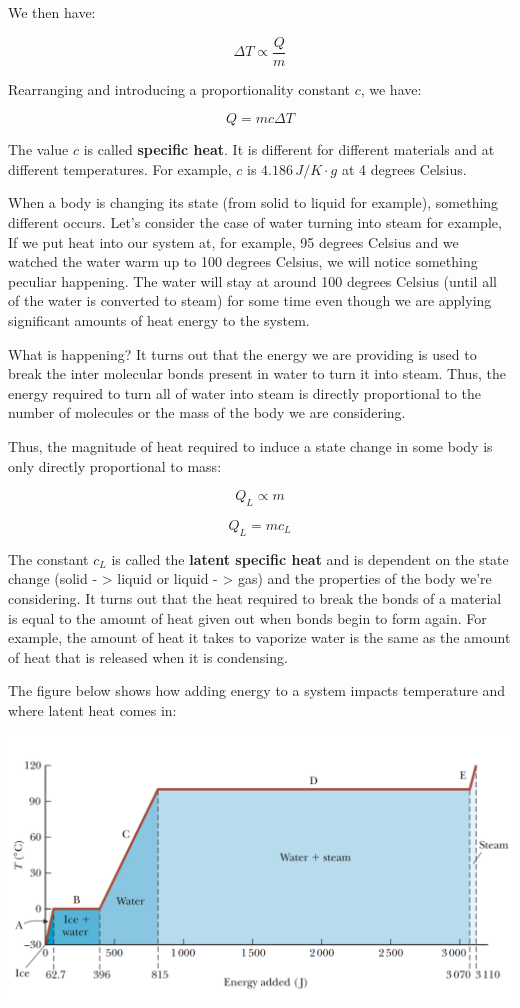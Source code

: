 \documentclass{report}
\begin{document}
We then have:

$$\Delta T \propto \frac{Q}{m}$$

Rearranging and introducing a proportionality constant $c$, we have:

$$Q = mc\Delta T $$

The value $c$ is called \textbf{specific heat}. It is different for different materials and at different temperatures. For example, $c$ is $4.186 \, J/K\cdot g$ at 4 degrees Celsius.


When a body is changing its state (from solid to liquid for example), something different occurs. Let's consider the case of water turning into steam for example, If we put heat into our system at, for example, 95 degrees Celsius and we watched the water warm up to 100 degrees Celsius, we will notice something peculiar happening. The water will stay at around 100 degrees Celsius (until all of the water is converted to steam) for some time even though we are applying significant amounts of heat energy to the system.

What is happening? It turns out that the energy we are providing is used to break the inter molecular bonds present in water to turn it into steam. Thus, the energy required to turn all of water into steam is directly proportional to the number of molecules or the mass of the body we are considering.

Thus, the magnitude of heat required to induce a state change in some body is only directly proportional to mass:

$$Q_L \propto m$$

$$Q_L = mc_L$$


The constant $c_L$ is called the \textbf{latent specific heat} and is dependent on the state change (solid - > liquid or liquid - > gas) and the properties of the body we're considering. It turns out that the heat required to break the bonds of a material is equal to the amount of heat given out when bonds begin to form again. For example, the amount of heat it takes to vaporize water is the same as the amount of heat that is released when it is condensing.

The figure below shows how adding energy to a system impacts temperature and where latent heat comes in:

\includegraphics[scale=0.5]{energy_temp.PNG}
\end{document}
